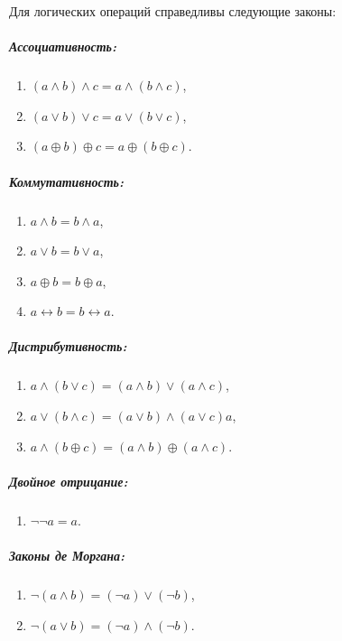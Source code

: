 \begin{thm} Для логических операций справедливы следующие законы:

\subparagraph{Ассоциативность:}
\begin{enumerate}
\item $(a \land b) \land c = a \land (b \land c)$,
\item $(a \lor b) \lor c = a \lor (b \lor c)$,
\item $(a \oplus b) \oplus c = a \oplus (b \oplus c)$.
\end{enumerate}

\subparagraph{Коммутативность:}
\begin{enumerate}
\item $a \land b = b \land a$,
\item $a \lor b = b \lor a$,
\item $a \oplus b = b \oplus a$,
\item $a \leftrightarrow b = b \leftrightarrow a$.
\end{enumerate}

\subparagraph{Дистрибутивность:}
\begin{enumerate}
\item $a \land (b \lor c) = (a \land b) \lor (a \land c)$,
\item $a \lor (b \land c) = (a \lor b) \land (a \lor c)a$,
\item $a \land (b \oplus c) = (a \land b) \oplus (a \land c)$.
\end{enumerate}

\subparagraph{Двойное отрицание:}
\begin{enumerate}
\item $\neg\neg a = a$.
\end{enumerate}

\subparagraph{Законы де Моргана:}
\begin{enumerate}
\item $\neg (a \land b) = (\neg a) \lor (\neg b)$,
\item $\neg (a \lor b) = (\neg a) \land (\neg b)$.
\end{enumerate}


\end{thm}
